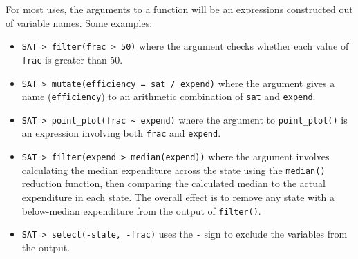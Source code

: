 \documentclass[
  letterpaper,
  DIV=11,
  numbers=noendperiod,
  oneside]{scrartcl}
\providecommand{\tightlist}{%
  \setlength{\itemsep}{0pt}\setlength{\parskip}{0pt}}\usepackage{longtable,booktabs,array}
\begin{document}
For most uses, the arguments to a function will be an expressions
constructed out of variable names. Some examples:

\begin{itemize}
\tightlist
\item
  \texttt{SAT\ \textbar{}\textgreater{}\ filter(frac\ \textgreater{}\ 50)}
  where the argument checks whether each value of \texttt{frac} is
  greater than 50.
\item
  \texttt{SAT\ \textbar{}\textgreater{}\ mutate(efficiency\ =\ sat\ /\ expend)}
  where the argument gives a name (\texttt{efficiency}) to an arithmetic
  combination of \texttt{sat} and \texttt{expend}.
\item
  \texttt{SAT\ \textbar{}\textgreater{}\ point\_plot(frac\ \textasciitilde{}\ expend)}
  where the argument to \texttt{point\_plot()} is an expression
  involving both \texttt{frac} and \texttt{expend}.
\item
  \texttt{SAT\ \textbar{}\textgreater{}\ filter(expend\ \textgreater{}\ median(expend))}
  where the argument involves calculating the median expenditure across
  the state using the \texttt{median()} reduction function, then
  comparing the calculated median to the actual expenditure in each
  state. The overall effect is to remove any state with a below-median
  expenditure from the output of \texttt{filter()}.
\item
  \texttt{SAT\ \textbar{}\textgreater{}\ select(-state,\ -frac)} uses
  the \texttt{-} sign to exclude the variables from the output.
\end{itemize}
\end{document}
